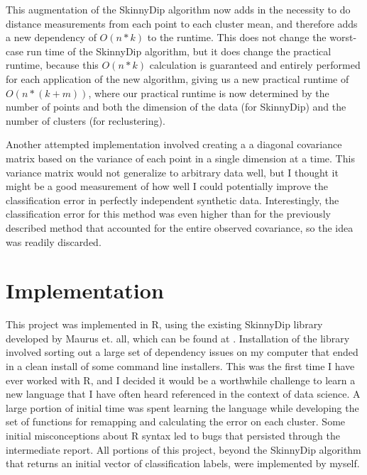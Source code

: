 \documentclass{sig-alternate-05-2015}
\begin{document}
This augmentation of the SkinnyDip algorithm now adds in the necessity to do distance measurements from each point to each cluster mean, and therefore adds a new dependency of $O(n*k)$ to the runtime. This does not change the worst-case run time of the SkinnyDip algorithm, but it does change the practical runtime, because this $O(n*k)$ calculation is guaranteed and entirely performed for each application of the new algorithm, giving us a new practical runtime of $O(n*(k+m))$, where our practical runtime is now determined by the number of points and both the dimension of the data (for SkinnyDip) and the number of clusters (for reclustering).

Another attempted implementation involved creating a a diagonal covariance matrix based on the variance of each point in a single dimension at a time. This variance matrix would not generalize to arbitrary data well, but I thought it might be a good measurement of how well I could potentially improve the classification error in perfectly independent synthetic data. Interestingly, the classification error for this method was even higher than for the previously described method that accounted for the entire observed covariance, so the idea was readily discarded.







\section{Implementation}
This project was implemented in R, using the existing SkinnyDip library developed by Maurus et. all, which can be found at \cite{skinnycode}. Installation of the library involved sorting out a large set of dependency issues on my computer that ended in a clean install of some command line installers. This was the first time I have ever worked with R, and I decided it would be a worthwhile challenge to learn a new language that I have often heard referenced in the context of data science. A large portion of initial time was spent learning the language while developing the set of functions for remapping and calculating the error on each cluster. Some initial misconceptions about R syntax led to bugs that persisted through the intermediate report. All portions of this project, beyond the SkinnyDip algorithm that returns an initial vector of classification labels, were implemented by myself.
\end{document}
